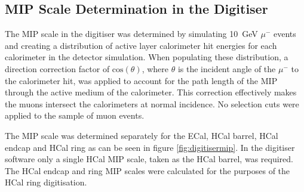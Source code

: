 
\subsection{MIP Scale Determination in the Digitiser}
\label{sec:mipresponse}
The MIP scale in the digitiser was determined by simulating 10~GeV $\mu^{-}$ events and creating a distribution of active layer calorimeter hit energies for each calorimeter in the detector simulation.  When populating these distribution, a direction correction factor of $\text{cos}(\theta)$, where $\theta$ is the incident angle of the $\mu^{-}$ to the calorimeter hit, was applied to account for the path length of the MIP through the active medium of the calorimeter.  This correction effectively makes the muons intersect the calorimeters at normal incidence.  No selection cuts were applied to the sample of muon events.  

The MIP scale was determined separately for the ECal, HCal barrel, HCal endcap and HCal ring as can be seen in figure \ref{fig:digitisermip}.  In the digitiser software only a single HCal MIP scale, taken as the HCal barrel, was required.  The HCal endcap and ring MIP scales were calculated for the purposes of the HCal ring digitisation.  

